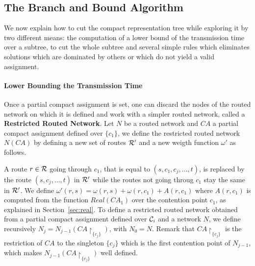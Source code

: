 \subsection{The Branch and Bound Algorithm}


We now explain how to cut the compact representation tree while exploring it by two different means:
the computation of a lower bound of the transmission time over a subtree, to cut the whole subtree and 
several simple rules which eliminates solutions which are dominated by others or which do not yield a valid assignment.


\paragraph{Lower Bounding the Transmission Time}


Once a partial compact assignment is set, one can discard the nodes of the routed network on which it is defined
and work with a simpler routed network, called a \textbf{Restricted Routed Network}. Let $N$ be a routed network
and $CA$ a partial compact assignment defined over $\{c_1\}$, we define the restricted routed network $N(CA)$ by defining a new set of routes ${\cal R}'$ and a new weigth function $\omega'$ as follows. 


A route $r \in {\cal R}$ going through $c_1$, that is equal to $(s,c_1,c_j,\ldots,t)$,  is replaced by the route $(s,c_j,\ldots,t)$ in ${\cal R}'$ while the routes not going throug $c_1$ stay the same in ${\cal R}'$. We define $\omega'(r,s) = \omega(r,s)+\omega(r,c_1) + A(r,c_1)$ where $A(r,c_1)$ is computed from the function $Real(CA_1)$ over the contention point $c_1$, as explained in Section~\ref{sec:real}. To define a restricted routed network obtained from a partial compact assignment defined over ${\cal C}_i$ and a network $N$, we define recursively $N_j = N_{j-1}(CA\restriction_{\{c_j\}})$, with $N_0 = N$. Remark that $CA\restriction_{\{c_j\}}$ is the restriction of $CA$ to the singleton $\{c_j\}$ which is the first contention point of $N_{j-1}$, which makes $N_{j-1}(CA\restriction_{\{c_j\}})$ well defined.


